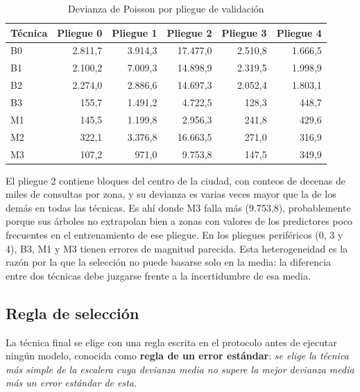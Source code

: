 \begin{table}[H]
  \centering
  \caption{Devianza de Poisson por pliegue de validación}
  \label{tab:cv-pliegues}
  \interlineadoSimple
  \small
  \begin{tabular}{@{}lrrrrr@{}}
    \toprule
    \textbf{Técnica} & \textbf{Pliegue 0} & \textbf{Pliegue 1} & \textbf{Pliegue 2} & \textbf{Pliegue 3} & \textbf{Pliegue 4} \\
    \midrule
    B0 & 2.811,7 & 3.914,3 & 17.477,0 & 2.510,8 & 1.666,5 \\
    B1 & 2.100,2 & 7.009,3 & 14.898,9 & 2.319,5 & 1.998,9 \\
    B2 & 2.274,0 & 2.886,6 & 14.697,3 & 2.052,4 & 1.803,1 \\
    B3 & 155,7 & 1.491,2 & 4.722,5 & 128,3 & 448,7 \\
    M1 & 145,5 & 1.199,8 & 2.956,3 & 241,8 & 429,6 \\
    M2 & 322,1 & 3.376,8 & 16.663,5 & 271,0 & 316,9 \\
    M3 & 107,2 & 971,0 & 9.753,8 & 147,5 & 349,9 \\
    \bottomrule
  \end{tabular}
\end{table}

El pliegue 2 contiene bloques del centro de la ciudad, con conteos de decenas de miles de
consultas por zona, y su devianza es varias veces mayor que la de los demás en todas las
técnicas. Es ahí donde M3 falla más (9.753,8), probablemente porque sus árboles no
extrapolan bien a zonas con valores de los predictores poco frecuentes en el
entrenamiento de ese pliegue. En los pliegues periféricos (0, 3 y 4), B3, M1 y M3 tienen
errores de magnitud parecida. Esta heterogeneidad es la razón por la que la selección no
puede basarse solo en la media: la diferencia entre dos técnicas debe juzgarse frente a
la incertidumbre de esa media.

\subsection{Regla de selección}
\label{sec:regla-seleccion}

La técnica final se elige con una regla escrita en el protocolo antes de ejecutar ningún
modelo, conocida como \textbf{regla de un error estándar}: \emph{se elige la técnica más
simple de la escalera cuya devianza media no supere la mejor devianza media más un error
estándar de esta.}

